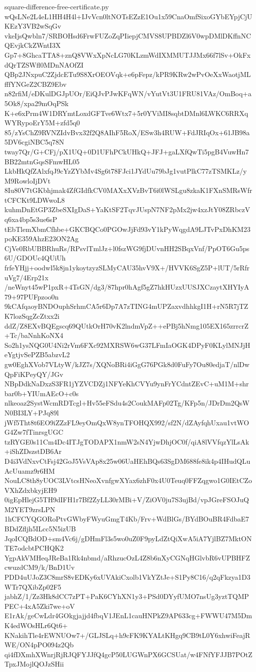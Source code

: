 \documentclass[11pt]{article}
\theoremstyle{definition}
\theoremstyle{remark}
\begin{document}
\begin{filecontents*}[overwrite]{square-difference-free-certificate.py}
wQsLNe2L4eL1HH4H4l+IJvVcn0ltNOTsEZzE1Ou1x59CnaOmfSixoGYbEYpjCjUKEzY3VB2wSqGv
vkeIjsQwbln7/SRBOHsd6FrwFUZoZqPIiepjCMVS8UPBDZl6V0wpDMlDKffnNCQEvjkCkZWntI3X
Gp7+8GhcaTTA8+znQ8VWxXpNcLG70KLzmWdIXMMUTJJMx66f7lSv+OkFxdQrTZSWfl0MDnNAOfZI
QBp2JNxpuC2ZjdcETu9S8XrOEOVqk+e6pFepz/kPR9KRw2wPvOeXxWaotjMLfffYNGeZ2CBZ9Ebv
n82rfiM/eDKulDGJpUOr/EiQJvPJwKFqWN/vYutVt3U1FRU81VAz/OmBoq+a5Ok8/xpa29mOqPSk
K+e6xPrm4W1DRYmtLoxdGFTve6Wtx7+5r0YViMI8sqbtDMnl6LWKC6RRXqWYRypoErY5M+zfd5q0
85/zYsChZ9RVNZIdvBvx32f2Q8AIhF5RoX/ESw3h4RUW+FdJRIqOx+61JB98a5DV6cgiNBC5q78N
tway7Qr/G+CFj/pX1UQ+0D1UFhPCkUHkQ+JFJ+gaLXfQwTi5pgB4VuwHn7BB22mtnGqsSFmwHL05
LkbHkQfZAlxfqJ9cYzZYbMv4Sg6t78FJci1JYdUu79bJg1vutPlkC77zTSMKLz/yM9RowloIjDVt
8Iu80V7tGKbhjmak4ZfGIdfkCV0MAXxXVzBvT6i0lWSLgu8zkaK1FXnSMRsWfrtCFCKt9LDWwoL8
kuhmDnEtGP3ZbeSXIgDaS+YaKtSF2TqvJUspN7NF2pMx2jw4xzJtY08ZRbczVq6xa4bp5s3ue6sP
tEbTlemXbmCfhbe+GKCBQCo0PGOwJjFd93vY1kPyWqgdA9LJTvPxDhKM23poKE359AhzE23ON2Ag
CjVe0RbUBBRhuRs/RPsvlTmlJz+l0fszWG9fjDUvnHH2SBqxVnf/PpOT6Gu5ps6U/GDOUc4QUiUh
frfeYHjj+oodwl5k8jn1ykoytzyzSLMyCAU35hvV9X+/HVVK6SgZ5P+lUT/5rRfruVg7/4Erp21x
/neWnyt45wP1pxR+4TsGN/dg3/87hpr0hAgf5gZ7hkHUzxUUSJXCzaytXHYIyA79+97PUFpzoo0n
9kCAfqaoyBNDOuphSrhmCA5r6Dp7A7zTING4mUPZaxvdhhkgI1H+rN5R7jTZK7lozSqgZcZtxx2i
ddZ/Z8EXvBQEgscq69QUtkOrH70vK2lndmVpZ++ePBj5hNmg105EX165zrrcrZ+Tc/baNnhKoNX4
So2h1ysNQG0U4Ni2rVm6FXc92MXRSW6wG37LFmIaOGK4DPyF0KLylMNJjHeYgtjvSePZB5abzvL2
gw0EghXVob7VLtyW/kJZ7s/XQNoBRi4iGgG76PGk8d0FuFy7Ou80edjaT/nlDwQpFiKPeyQY/JGv
NBpDdkNaDxzS3FR1jYZVCDZj1NFYeKhCVYu9ynFrYCdntZEvC+uM1M+shrbar0b+YIUmAEcO+c0s
nlkeoaz2SystWcmRDTcgl+Hv55eFSdu4s2CoukMAFp02Tg/KFp5n/JDrDm2QsWN0BI3LY+PJq89l
jWf5Tht8t6EO9iZZzFL9eyOmQxW8ynTFOHQX992/sf2N/dZAyfqhUxau1vtWOG4Zw7fTinrsgUGC
tzRYGE0s11Cm4Dc4ITJgTODAPX1nmW2sN4YjwDhjOC0f/qiA8lVVfqzYlLsAk+iShZDszstDB6Ar
D4i3VdNxvCtFsj42GoJ5VsVAp8x25w06UaHEhBQs63SgDM688fe8ik4p4IHudQLuAcUuamz9r6HM
NouLC8th8yUOC3LVtcsHNeoXvnfgwXYax6zhF0x4U0Teuq0FFZqgwo1G0IEtCZoVXhZdxbkyjEH9
0igEpHlejG5TH9dIFH1r7Bf2ZyLL30rMBi+V/ZiOV0ju7S3ujBd/vpJGreFSOJuQM2YET9zrsLPN
1hCFCYQGORoPtvGWbyFWyuGmgT4Kb/Frv+WdBlGs/BYdBOuBR4FdbaE7BDdZfljh5ILcc5N5izUB
JqoICQBdOD+sm4Vc6j/gDHmFl3s5wo0uZ0F9pyLdZtQiXwA5iA7YjlBZ7MktONTE7odcbtPCHQK2
YgpAkVMHeqJReBa1Rk4nbmd/aRhzucOzL4Z8b6nXyCGNqHGlvbR6vUPBHFZcwuzdCM9/k/BnD1Uv
PDD4uUJoZ3C8mrS8vEDKy6xUVAkiCxolb1VkYZtJe+S1Py8C16/q2qFkzya1D3WTr7QXibZp02F5
jabhZ/1/Zz3Hk8dCC7zPT+PaK6CYhXN1y3+PSd0DYyfUMO7nsUg3yztTQMPPEC+4xA5Zki7we+oV
E1rAk/geCwLdr4GOkgjajjd4fbqV1JEnL1cauHNPkZ9AP633cg+FWWU47M5DmK4edWOsHLr6Qt6+
KNakihTle4rEWNUOw7+/GLJSLq+h9cFK9KYALtKHgq9CB9tL0Y6xhwiFeajRWE/ON4pPO094z2Qb
qi4fDXmhXWnrjRjRJQFYJJfQ4gcP50LUGWnPX6GCSUat/w4FNfYFJJB7POtZTpxJMojlQOJzSHii

\end{filecontents*}
\end{document}
